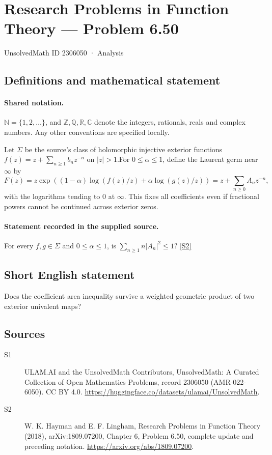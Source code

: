 \documentclass[11pt]{article}
\newcommand{\sref}[2]{\hyperlink{source:#1:#2}{[S#2]}}
\begin{document}
\setcounter{section}{2306049}
\section{Research Problems in Function Theory — Problem 6.50}\label{2306050}
{\small\sffamily UnsolvedMath ID 2306050 · Analysis}
\subsection{Definitions and mathematical statement}

\paragraph{Shared notation.}$\mathbb N=\{1,2,\ldots\}$, and $\mathbb Z,\mathbb Q,\mathbb R,\mathbb C$ denote the integers, rationals, reals and complex numbers. Any other conventions are specified locally.


Let $\Sigma$ be the source's class of holomorphic injective exterior functions $f(z)=z+\sum_{n\ge1}b_nz^{-n}$ on $|z|>1$.For $0\le\alpha\le1$, define the Laurent germ near $\infty$ by
\[F(z)=z\exp\left((1-\alpha)\log(f(z)/z)+\alpha\log(g(z)/z)\right)=z+\sum_{n\ge0}A_nz^{-n},\]
with the logarithms tending to $0$ at $\infty$. This fixes all coefficients even if fractional powers cannot be continued across exterior zeros.
\paragraph{Statement recorded in the supplied source.}
For every $f,g\in\Sigma$ and $0\le\alpha\le1$, is $\sum_{n\ge1}n|A_n|^2\le1$? \sref{2306050}{2}
\subsection{Short English statement}
Does the coefficient area inequality survive a weighted geometric product of two exterior univalent maps?
\subsection{Sources}
\begin{description}
\item[\hypertarget{source:2306050:1}{S1}] ULAM.AI and the UnsolvedMath Contributors, UnsolvedMath: A Curated Collection of Open Mathematics Problems, record 2306050 (AMR-022-6050). CC BY 4.0. \url{https://huggingface.co/datasets/ulamai/UnsolvedMath}.
\item[\hypertarget{source:2306050:2}{S2}] W. K. Hayman and E. F. Lingham, Research Problems in Function Theory (2018), arXiv:1809.07200, Chapter 6, Problem 6.50, complete update and preceding notation. \url{https://arxiv.org/abs/1809.07200}.
\end{description}
\label{end:2306050}
\end{document}
